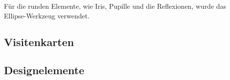 Für die runden Elemente, wie Iris, Pupille und die Reflexionen, wurde das Ellipse-Werkzeug verwendet.

\subsection{Visitenkarten}
\subsection{Designelemente}